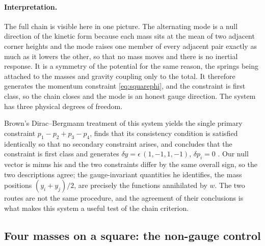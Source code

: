 \documentclass[12pt]{article}
\theoremstyle{plain}
\theoremstyle{definition}
\theoremstyle{remark}
\begin{document}
	\paragraph{Interpretation.} The full chain is visible here in one picture. The
	alternating mode is a null direction of the kinetic form because each mass sits
	at the mean of two adjacent corner heights and the mode raises one member of
	every adjacent pair exactly as much as it lowers the other, so that no mass
	moves and there is no inertial response. It is a symmetry of the potential for
	the same reason, the springs being attached to the masses and gravity coupling
	only to the total. It therefore generates the momentum constraint
	\eqref{eq:squarephi}, and the constraint is first class, so the chain closes and
	the mode is an honest gauge direction. The system has three physical degrees of
	freedom.
	
	Brown's Dirac--Bergmann treatment of this system yields the single primary
	constraint $p_{1}-p_{2}+p_{3}-p_{4}$, finds that its consistency condition is
	satisfied identically so that no secondary constraint arises, and concludes that
	the constraint is first class and generates $\delta y=\epsilon\,(1,-1,1,-1)$,
	$\delta p_{i}=0$ \cite{Brown2023}. Our null vector is minus his and the two
	constraints differ by the same overall sign, so the two descriptions agree; the
	gauge-invariant quantities he identifies, the mass positions
	$(y_{i}+y_{j})/2$, are precisely the functions annihilated by $w$. The two
	routes are not the same procedure, and the agreement of their conclusions is
	what makes this system a useful test of the chain criterion.
	
	\subsection{Four masses on a square: the non-gauge control}
	\label{sec:square-control}
	
\end{document}
